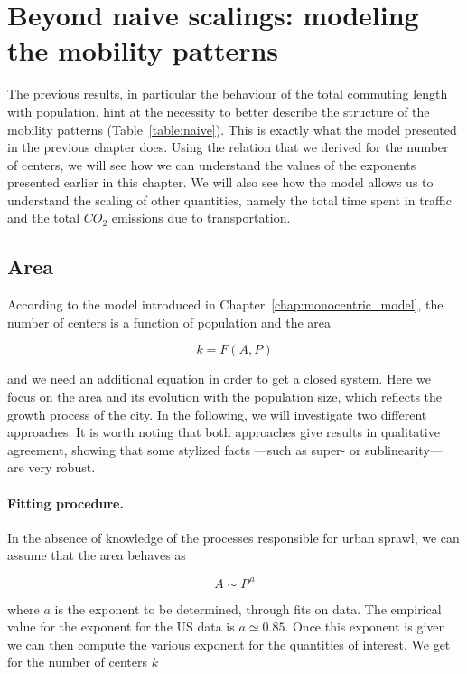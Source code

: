 \section{Beyond naive scalings: modeling the mobility patterns}

The previous results, in particular the behaviour of the total commuting length
with population, hint at the necessity to better describe the structure of the
mobility patterns (Table~\ref{table:naive}). This is exactly what the model presented in the previous
chapter does.  Using the relation that we derived for the number of centers, we will see
how we can understand the values of the exponents presented earlier in this
chapter. We will also see how the model allows us to understand the scaling of
other quantities, namely the total time spent in traffic and the total $CO_2$
emissions due to transportation.

\subsection{Area}

According to the model introduced in Chapter~\ref{chap:monocentric_model}, the number of centers is a function of population and the area

\begin{equation}
    k = F\left(A,P\right)
\end{equation}

and we need an additional equation in order to get a closed system. Here we
focus on the area and its evolution with the population size, which reflects the
growth process of the city. In the following, we will investigate two different
approaches. It is worth noting that both approaches give results in qualitative
agreement, showing that some stylized facts ---such as super- or sublinearity---
are very robust.\\ 

\paragraph{Fitting procedure.}

In the absence of knowledge of the processes responsible for urban sprawl, we
can assume that the area behaves as 

\begin{equation}
    A \sim P^{\,a}
    \label{eq:fit}
\end{equation}

where $a$ is the exponent to be determined, through fits on data. The empirical
value for the exponent for the US data is $a\simeq 0.85$. Once this exponent is
given we can then compute the various exponent for the quantities of interest.
We get for the number of centers $k$

